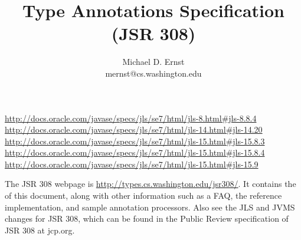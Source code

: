 \documentclass[10pt]{article}
\title{Type Annotations Specification (JSR 308)}
\author{Michael D. Ernst \\
{\ttfamily mernst@cs.washington.edu}
}
\begin{document}
\def\codesize{\smaller}
\newcommand{\code}[1]{{\ifmmode{\mbox{\codesize\ttfamily{#1}}}\else{\codesize\ttfamily #1}\fi}}
\def\<#1>{\code{#1}}
\newcommand{\codesmall}[1]{\ifmmode{\mbox{\small\ttfamily{#1}}}\else{\small\ttfamily #1}\fi}
\newcommand{\codefootnotesize}[1]{\ifmmode{\mbox{\footnotesize\ttfamily{#1}}}\else{\footnotesize\ttfamily #1}\fi}
\newcommand{\myurl}[1]{{\codesize\url{#1}}}





\makeatletter
\def\topfigrule{\kern3\p@ \hrule \kern -3.4\p@} %
\def\botfigrule{\kern-3\p@ \hrule \kern 2.6\p@} %
\def\dblfigrule{\kern3\p@ \hrule \kern -3.4\p@} %
\makeatother


\urldef{\jlsEightEightFour}\url{http://docs.oracle.com/javase/specs/jls/se7/html/jls-8.html#jls-8.8.4}
\urldef{\jlsFourteenTwenty}\url{http://docs.oracle.com/javase/specs/jls/se7/html/jls-14.html#jls-14.20}
\urldef{\jlsFifteenEightThree}\url{http://docs.oracle.com/javase/specs/jls/se7/html/jls-15.html#jls-15.8.3}
\urldef{\jlsFifteenEightFour}\url{http://docs.oracle.com/javase/specs/jls/se7/html/jls-15.html#jls-15.8.4}
\urldef{\jlsFifteenNine}\url{http://docs.oracle.com/javase/specs/jls/se7/html/jls-15.html#jls-15.9}



\maketitle

The JSR 308 webpage is \myurl{http://types.cs.washington.edu/jsr308/}.
It contains the
of this document, along
with other information such as a FAQ, the reference implementation, and
sample annotation processors.
Also see the JLS and JVMS changes for JSR 308, which can be found in
the Public Review specification of JSR 308 at jcp.org.
\end{document}
